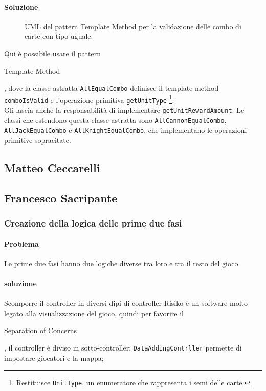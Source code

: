 \documentclass[a4paper,12pt]{report}
\begin{document}
\paragraph{Soluzione}
\begin{figure}[H]
	\centering
	
	\caption{UML del pattern Template Method per la validazione delle combo di carte con tipo uguale.}
\end{figure}
Qui è possibile usare il pattern \begin{itshape}Template Method\end{itshape}, dove la classe astratta \texttt{AllEqualCombo} definisce il template method \texttt{comboIsValid} e l'operazione primitiva \texttt{getUnitType} \footnote{Restituisce \texttt{UnitType}, un enumeratore che rappresenta i semi delle carte.}.
\\
Gli lascia anche la responsabilità di implementare \texttt{getUnitRewardAmount}. Le classi che estendono questa classe astratta sono \texttt{AllCannonEqualCombo}, \texttt{AllJackEqualCombo} e \texttt{AllKnightEqualCombo}, che implementano le operazioni primitive sopracitate.

\subsection{Matteo Ceccarelli}
\subsection{Francesco Sacripante}
\subsubsection{Creazione della logica delle prime due fasi}
\paragraph{Problema}
Le prime due fasi hanno due logiche diverse tra loro e tra il resto del gioco
\paragraph{soluzione}
Scomporre il controller in diversi dipi di controller
Risiko è un software molto legato alla visualizzazione del gioco, quindi per favorire il \begin{itshape}Separation of Concerns\end{itshape}, il controller è diviso in sotto-controller: \texttt{DataAddingContrller} permette di impostare giocatori e la mappa;
\end{document}
